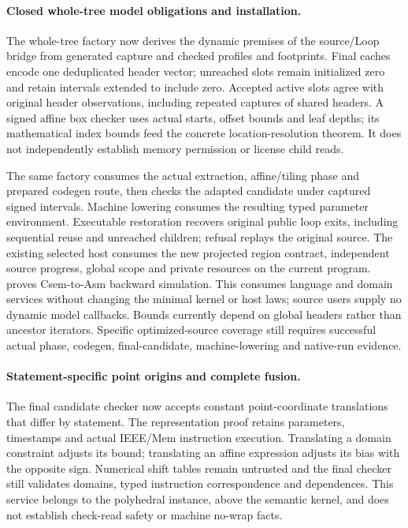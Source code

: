 \paragraph{Closed whole-tree model obligations and installation.}
The whole-tree factory now derives the dynamic premises of the source/Loop
bridge from generated capture and checked profiles and footprints. Final caches
encode one deduplicated header vector; unreached slots remain initialized zero
and retain intervals extended to include zero. Accepted active slots agree with
original header observations, including repeated captures of shared headers.
A signed affine box checker uses actual starts, offset bounds and leaf depths;
its mathematical index bounds feed the concrete location-resolution theorem.
It does not independently establish memory permission or license child reads.

The same factory consumes the actual extraction, affine/tiling phase and prepared
codegen route, then checks the adapted candidate under captured signed intervals.
Machine lowering consumes the resulting typed parameter environment. Executable
restoration recovers original public loop exits, including sequential reuse and
unreached children; refusal replays the original source. The existing selected
host consumes the new projected region contract, independent source progress,
global scope and private resources on the current program.
 proves Csem-to-Asm backward
simulation. This consumes language and domain services without changing the
minimal kernel or host laws; source users supply no dynamic model callbacks.
Bounds currently depend on global headers rather than ancestor iterators.
Specific optimized-source coverage still requires successful actual phase,
codegen, final-candidate, machine-lowering and native-run evidence.

\paragraph{Statement-specific point origins and complete fusion.}
The final candidate checker now accepts constant point-coordinate translations
that differ by statement. The representation proof retains parameters,
timestamps and actual IEEE/Mem instruction execution. Translating a domain
constraint adjusts its bound; translating an affine expression adjusts its bias
with the opposite sign. Numerical shift tables remain untrusted and the final
checker still validates domains, typed instruction correspondence and
dependences. This service belongs to the polyhedral instance, above the semantic
kernel, and does not establish check-read safety or machine no-wrap facts.

